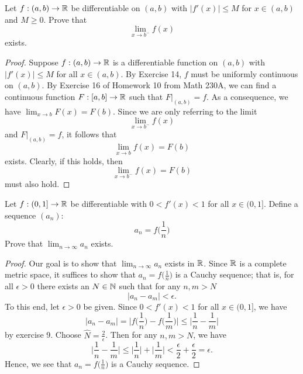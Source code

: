 \documentclass[a4paper]{article}
\begin{document}
\begin{problem}
    Let \( f: (a,b) \to \mathbb{R}  \) be differentiable on \( (a,b) \) with \( | f'(x)  |  \leq M  \) for \( x \in (a,b) \) and \( M \geq 0  \). Prove that 
    \[  \lim_{ x \to b^{-} }  f(x) \] 
    exists.
\end{problem}
\begin{proof}
    Suppose \( f: (a,b) \to \mathbb{R}  \) is a differentiable function on \( (a,b) \) with \( | f'(x) | \leq M  \) for all \( x \in (a,b) \). By Exercise 14, \( f  \) must be uniformly continuous on \( (a,b) \). By Exercise 16 of Homework 10 from Math 230A, we can find a continuous function \( F: [a,b] \to \mathbb{R}  \) such that \( F |_{(a,b)} = f \). As a consequence, we have \( \lim_{ x \to b } F(x) = F(b) \). Since we are only referring to the limit 
    \[  \lim_{ x \to b^{-} }  f(x) \]
    and \( F |_{(a,b)} = f  \), it follows that 
    \[  \lim_{ x \to b } f(x) = F(b) \]
    exists. Clearly, if this holds, then 
    \[  \lim_{ x \to b^{-} } f(x) = F(b) \]
    must also hold.
\end{proof}

\begin{problem}
    Let \( f: (0,1] \to \mathbb{R}  \) be differentiable with \( 0 < f'(x) < 1  \) for all \( x \in (0,1] \). Define a sequence \( ({a}_{n}) \):
    \[  {a}_{n} = f \Big(  \frac{ 1 }{ n }  \Big) \]
    Prove that \( \lim_{ n \to \infty  } {a}_{n}  \) exists.
\end{problem}

\begin{proof}
    Our goal is to show that \( \lim_{ n \to \infty  } {a}_{n} \) exists in \( \mathbb{R}  \). Since \( \mathbb{R}  \) is a complete metric space, it suffices to show that \( {a}_{n} = f \Big(  \frac{ 1 }{ n }  \Big) \) is a Cauchy sequence; that is, for all \( \epsilon > 0  \) there exists an \( N \in \mathbb{N}  \) such that for any \( n,m > N \)
    \[  | {a}_{n} - {a}_{m} | < \epsilon.   \]
    To this end, let \( \epsilon > 0  \) be given. Since \( 0 < f'(x) < 1 \) for all \( x \in (0,1] \), we have    
    \[  | {a}_{n} - {a}_{m} |  = \Big| f \Big(  \frac{ 1 }{ n }  \Big) - f \Big(  \frac{ 1 }{ m }  \Big) \Big| \leq \Big| \frac{ 1 }{ n }  - \frac{ 1 }{ m }  \Big| \]
    by exercise 9.
            Choose \( \hat{N} = \frac{ 2 }{ \epsilon }  \). Then for any \( n,m > N  \), we have  
            \[  \Big| \frac{ 1 }{ n }  - \frac{ 1 }{ m }  \Big| \leq \Big| \frac{ 1 }{ n }  \Big|  + \Big| \frac{ 1 }{ m }  \Big|  < \frac{ \epsilon }{ 2 } + \frac{ \epsilon }{ 2 } = \epsilon.  \]
            Hence, we see that \( {a}_{n} = f \Big(  \frac{ 1 }{ n }  \Big) \) is a Cauchy sequence.
\end{proof}
\end{document}
